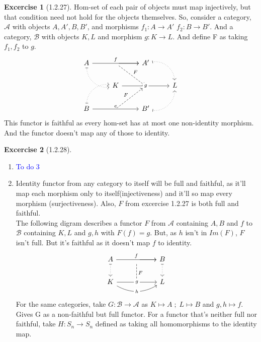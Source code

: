 \documentclass{article}
\theoremstyle{definition}
\newtheorem*{excercise}{Excercise}
\begin{document}
\begin{excercise}[1.2.27] %
	Hom-set of each pair of objects must map injectively, but that condition need not hold for the objects themselves.
	So, consider a category, $\mathcal{A}$ with objects $A,A',B,B'$, and morphisms $f_1:A\rightarrow A'$
	$f_2:B\rightarrow B'$. And a category, $\mathcal{B} $ with objects $K,L$ and morphism $g:K\rightarrow L$. And define F as taking $f_1,f_2$ to $g$.
	\[ \begin{tikzcd}
		A \arrow[rr, "f"] \arrow[rd, dotted, maps to, bend right=49] & {} \arrow[r] \arrow[rd, "F", dashed] & A' \arrow[rd, dotted, maps to, bend left=49] &   \\
									     & K \arrow[rr, "g" description]        & {}                                          & L \\
		B \arrow[rr, "e"] \arrow[ru, dotted, maps to, bend left=49]  & {} \arrow[ru, "F", dashed]           & B' \arrow[ru, dotted,maps to , bend right=49]         &
	\end{tikzcd}\]
	This functor is faithful as every hom-set has at most one non-identity morphism. And the  functor  doesn't map any of those to identity.

\end{excercise}
\begin{excercise}[1.2.28] %
	\begin{enumerate}[label=(\alph*)]
		\item \textcolor{blue}{To do 3}
		\item Identity functor from any category to itself will be full and faithful, as it'll map each morphism only to itself(injectiveness) and it'll so map every morphism (surjectiveness).
Also, $F$ from excercise 1.2.27 is both full and faithful. \\
The following digram describes a functor $F$ from $\mathcal{A} $ containing $A,B$ and $f$ to $\mathcal{B} $ containing $K,L$ and $g,h$ with $F(f) = g$. But, as $h$ isn't in $Im(F)$, $F$ isn't full. But it's faithful as it doesn't map $f$ to identity.
\[
\begin{tikzcd}
A \arrow[rr, "f"] \arrow[d, dotted, maps to]                          & {} \arrow[r] \arrow[d, "F", dashed] & B \arrow[d, dotted, maps to] \\
K \arrow[rr, "g" description] \arrow[rr, "h" description, bend right] & {}                                                      & L
\end{tikzcd}\]
For the same categories, take $G:\mathcal{B} \rightarrow \mathcal{A} $ as $K \mapsto A\; ; \; L \mapsto B $
and $g,h \mapsto f $. Gives G as a non-faithful but full functor. For a functor that's neither full nor faithful, take $H: S_n \rightarrow S_n$ defined as taking all homomorphisms to the identity map.

	\end{enumerate}
\end{excercise}
\end{document}
